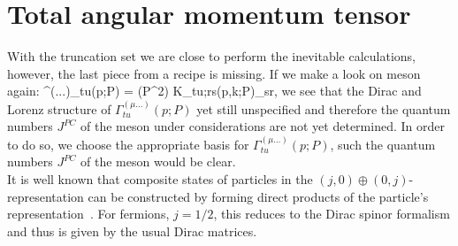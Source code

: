 \section{Total angular momentum tensor}
\label{bse:angular_tensor}
With the truncation set we are close to perform the inevitable calculations, however, the last piece from a recipe is missing. If we make a look on meson \BSE again:
\beqa
	\Gamma^{(\mu...)}_{tu}(p;P) = \lambda(P^2) \int {} K_{tu;rs}(p,k;P)_{sr}\;,
\eeqa
we see that the Dirac and Lorenz structure of $\Gamma^{(\mu...)}_{tu}(p;P)$ yet still unspecified and therefore the quantum numbers $J^{PC}$ of the meson under considerations are not yet determined. In order to do so, we choose the appropriate basis for $\Gamma^{(\mu...)}_{tu}(p;P)$, such the quantum numbers $J^{PC}$ of the meson would be clear. \\

It is well known that composite states of particles in the $\left(j,0\right)\oplus\left(0,j\right)$-representation can be constructed 
by forming direct products of the particle's representation~\cite{Joos:1962qq,Weinberg:1964cn}. For fermions, $j=1/2$, this reduces
to the Dirac spinor formalism and thus is given by the usual Dirac matrices. \\


